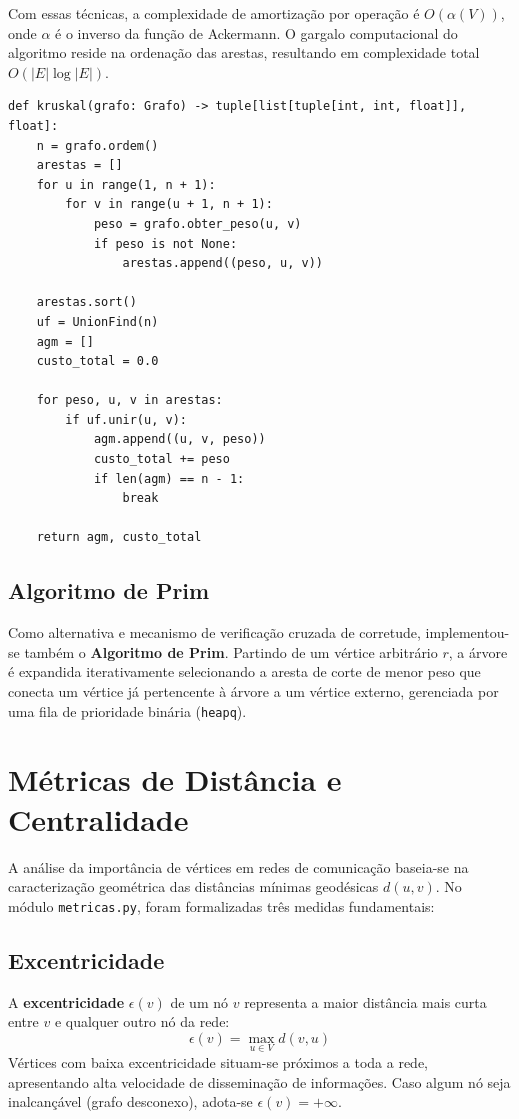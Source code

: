 \documentclass[12pt,a4paper]{article}
\begin{document}
Com essas técnicas, a complexidade de amortização por operação é $O(\alpha(V))$, onde $\alpha$ é o inverso da função de Ackermann. O gargalo computacional do algoritmo reside na ordenação das arestas, resultando em complexidade total $O(|E| \log |E|)$.

\begin{lstlisting}[caption={Algoritmo de Kruskal em \texttt{agm.py}}, label={cod:kruskal}]
def kruskal(grafo: Grafo) -> tuple[list[tuple[int, int, float]], float]:
    n = grafo.ordem()
    arestas = []
    for u in range(1, n + 1):
        for v in range(u + 1, n + 1):
            peso = grafo.obter_peso(u, v)
            if peso is not None:
                arestas.append((peso, u, v))

    arestas.sort()
    uf = UnionFind(n)
    agm = []
    custo_total = 0.0

    for peso, u, v in arestas:
        if uf.unir(u, v):
            agm.append((u, v, peso))
            custo_total += peso
            if len(agm) == n - 1:
                break

    return agm, custo_total
\end{lstlisting}

\subsection{Algoritmo de Prim}
Como alternativa e mecanismo de verificação cruzada de corretude, implementou-se também o \textbf{Algoritmo de Prim}. Partindo de um vértice arbitrário $r$, a árvore é expandida iterativamente selecionando a aresta de corte de menor peso que conecta um vértice já pertencente à árvore a um vértice externo, gerenciada por uma fila de prioridade binária (\texttt{heapq}).

\section{Métricas de Distância e Centralidade}

A análise da importância de vértices em redes de comunicação baseia-se na caracterização geométrica das distâncias mínimas geodésicas $d(u, v)$. No módulo \texttt{metricas.py}, foram formalizadas três medidas fundamentais:

\subsection{Excentricidade}
A \textbf{excentricidade} $\epsilon(v)$ de um nó $v$ representa a maior distância mais curta entre $v$ e qualquer outro nó da rede:
\begin{equation}
    \epsilon(v) = \max_{u \in V} d(v, u)
\end{equation}
Vértices com baixa excentricidade situam-se próximos a toda a rede, apresentando alta velocidade de disseminação de informações. Caso algum nó seja inalcançável (grafo desconexo), adota-se $\epsilon(v) = +\infty$.
\end{document}
